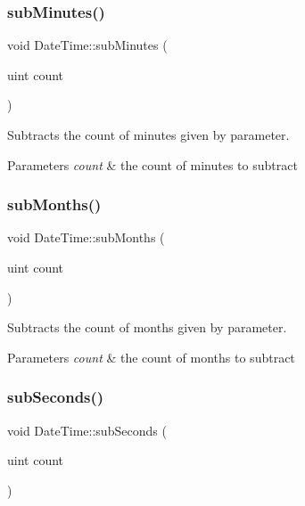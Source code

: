 \subsubsection{\texorpdfstring{subMinutes()}{subMinutes()}}
{\footnotesize\ttfamily void Date\+Time\+::sub\+Minutes (\begin{DoxyParamCaption}\item[{uint}]{count }\end{DoxyParamCaption})}



Subtracts the count of minutes given by parameter. 


\begin{DoxyParams}{Parameters}
{\em count} & the count of minutes to subtract \\
\hline
\end{DoxyParams}
\mbox{\label{class_date_time_a2030620c1d44592ee63d92a7f1161c26}} 
\subsubsection{\texorpdfstring{subMonths()}{subMonths()}}
{\footnotesize\ttfamily void Date\+Time\+::sub\+Months (\begin{DoxyParamCaption}\item[{uint}]{count }\end{DoxyParamCaption})}



Subtracts the count of months given by parameter. 


\begin{DoxyParams}{Parameters}
{\em count} & the count of months to subtract \\
\hline
\end{DoxyParams}
\mbox{\label{class_date_time_a985cb277733445af6b172ac9ec2630e9}} 
\subsubsection{\texorpdfstring{subSeconds()}{subSeconds()}}
{\footnotesize\ttfamily void Date\+Time\+::sub\+Seconds (\begin{DoxyParamCaption}\item[{uint}]{count }\end{DoxyParamCaption})}



